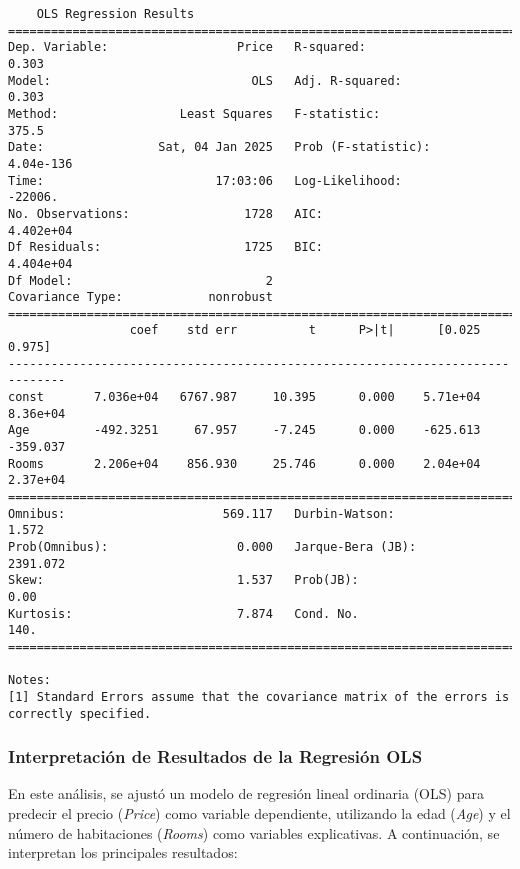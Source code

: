 \documentclass[a4paper,12pt]{article}
\begin{document}
\begin{verbatim}
    OLS Regression Results                            
==============================================================================
Dep. Variable:                  Price   R-squared:                       0.303
Model:                            OLS   Adj. R-squared:                  0.303
Method:                 Least Squares   F-statistic:                     375.5
Date:                Sat, 04 Jan 2025   Prob (F-statistic):          4.04e-136
Time:                        17:03:06   Log-Likelihood:                -22006.
No. Observations:                1728   AIC:                         4.402e+04
Df Residuals:                    1725   BIC:                         4.404e+04
Df Model:                           2                                         
Covariance Type:            nonrobust                                         
==============================================================================
                 coef    std err          t      P>|t|      [0.025      0.975]
------------------------------------------------------------------------------
const       7.036e+04   6767.987     10.395      0.000    5.71e+04    8.36e+04
Age         -492.3251     67.957     -7.245      0.000    -625.613    -359.037
Rooms       2.206e+04    856.930     25.746      0.000    2.04e+04    2.37e+04
==============================================================================
Omnibus:                      569.117   Durbin-Watson:                   1.572
Prob(Omnibus):                  0.000   Jarque-Bera (JB):             2391.072
Skew:                           1.537   Prob(JB):                         0.00
Kurtosis:                       7.874   Cond. No.                         140.
==============================================================================

Notes:
[1] Standard Errors assume that the covariance matrix of the errors is correctly specified.
\end{verbatim}

\subsubsection{Interpretación de Resultados de la Regresión OLS}

En este análisis, se ajustó un modelo de regresión lineal ordinaria (OLS) para predecir el precio (\textit{Price}) como variable dependiente, utilizando la edad (\textit{Age}) y el número de habitaciones (\textit{Rooms}) como variables explicativas. A continuación, se interpretan los principales resultados:
\end{document}
